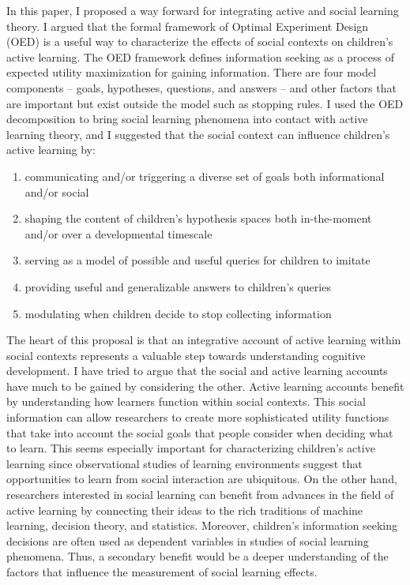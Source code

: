 \documentclass[oneside]{report}
\begin{document}
In this paper, I proposed a way forward for integrating active and
social learning theory. I argued that the formal framework of Optimal
Experiment Design (OED) is a useful way to characterize the effects of
social contexts on children's active learning. The OED framework defines
information seeking as a process of expected utility maximization for
gaining information. There are four model components -- goals,
hypotheses, questions, and answers -- and other factors that are
important but exist outside the model such as stopping rules. I used the
OED decomposition to bring social learning phenomena into contact with
active learning theory, and I suggested that the social context can
influence children's active learning by:
\begin{enumerate}
\def\labelenumi{\arabic{enumi}.}
\tightlist
\item
  communicating and/or triggering a diverse set of goals both
  informational and/or social
\item
  shaping the content of children's hypothesis spaces both in-the-moment
  and/or over a developmental timescale
\item
  serving as a model of possible and useful queries for children to
  imitate
\item
  providing useful and generalizable answers to children's queries
\item
  modulating when children decide to stop collecting information
\end{enumerate}
The heart of this proposal is that an integrative account of active
learning within social contexts represents a valuable step towards
understanding cognitive development. I have tried to argue that the
social and active learning accounts have much to be gained by
considering the other. Active learning accounts benefit by understanding
how learners function within social contexts. This social information
can allow researchers to create more sophisticated utility functions
that take into account the social goals that people consider when
deciding what to learn. This seems especially important for
characterizing children's active learning since observational studies of
learning environments suggest that opportunities to learn from social
interaction are ubiquitous. On the other hand, researchers interested in
social learning can benefit from advances in the field of active
learning by connecting their ideas to the rich traditions of machine
learning, decision theory, and statistics. Moreover, children's
information seeking decisions are often used as dependent variables in
studies of social learning phenomena. Thus, a secondary benefit would be
a deeper understanding of the factors that influence the measurement of
social learning effects.
\end{document}
